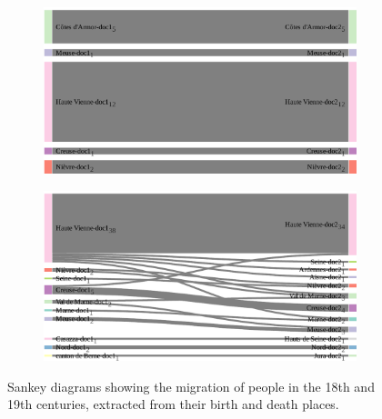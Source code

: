 \begin{figure}[!ht]
    \centering

    \begin{subfigure}{0.49\linewidth}
    \includegraphics[width=\textwidth]{static/figures/ComBiNet/OriginalPaperFigures/CGF/frenchGenealogy/migration_18.pdf}
    \end{subfigure}
    \begin{subfigure}{0.49\linewidth}
    \includegraphics[width=\textwidth]{static/figures/ComBiNet/OriginalPaperFigures/CGF/frenchGenealogy/migration_19.pdf}
    \end{subfigure}

    \caption{Sankey diagrams showing the migration of people in the 18th and 19th centuries, extracted from their birth and death places.}\label{fig:useCaseNicole2}
\end{figure}


